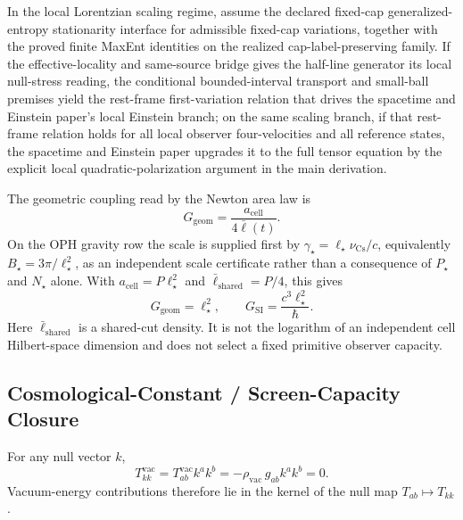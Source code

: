 \begin{theorem}
In the local Lorentzian scaling regime, assume the declared fixed-cap generalized-entropy
stationarity interface for admissible fixed-cap variations, together with the proved finite MaxEnt
identities on the realized cap-label-preserving family.  If the effective-locality and same-source
bridge gives the half-line generator its local null-stress reading, the conditional bounded-interval
transport and small-ball premises yield the rest-frame first-variation
relation that drives the spacetime and Einstein paper's local Einstein branch; on the same scaling branch, if that
rest-frame relation holds for all local observer four-velocities and all reference states, the
spacetime and Einstein paper upgrades it to the full tensor equation by the explicit local quadratic-polarization
argument in the main derivation.
\end{theorem}

\begin{theorem}
The geometric coupling read by the Newton area law is
\[
G_{\mathrm{geom}}=\frac{a_{\mathrm{cell}}}{4\bar{\ell}(t)}.
\]
On the OPH gravity row the scale is supplied first by
\(\gamma_\star=\ell_\star\nu_{\mathrm{Cs}}/c\), equivalently
\(B_\star=3\pi/\ell_\star^2\), as an independent scale certificate rather than a consequence of
\(P_\star\) and \(N_\star\) alone. With
\(a_{\mathrm{cell}}=P\ell_\star^2\) and \(\bar{\ell}_{\mathrm{shared}}=P/4\), this gives
\[
G_{\mathrm{geom}}=\ell_\star^2,
\qquad
G_{\mathrm{SI}}=\frac{c^3\ell_\star^2}{\hbar}.
\]
Here \(\bar{\ell}_{\mathrm{shared}}\) is a shared-cut density. It is not the logarithm of an
independent cell Hilbert-space dimension and does not select a fixed primitive observer capacity.
\end{theorem}

\subsection{Cosmological-Constant / Screen-Capacity Closure}

\begin{lemma}
For any null vector \(k\),
\[
T^{\mathrm{vac}}_{kk}
=
T^{\mathrm{vac}}_{ab}k^ak^b
=
-\rho_{\mathrm{vac}}\,g_{ab}k^ak^b
=
0.
\]
Vacuum-energy contributions therefore lie in the kernel of the null map
\(T_{ab}\mapsto T_{kk}\).
\end{lemma}

